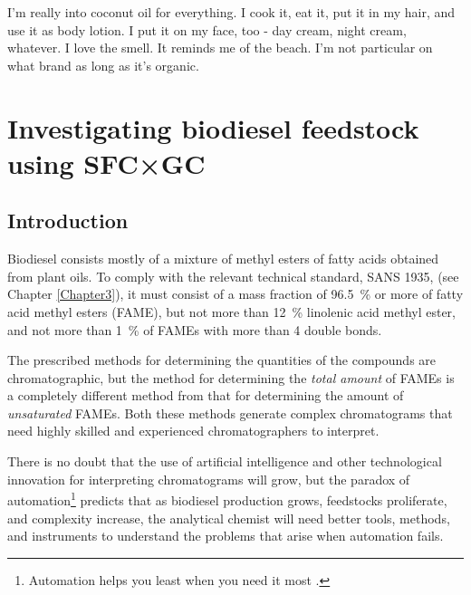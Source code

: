 
\begin{savequote}[\quotewidth] I'm really into coconut oil for everything. I cook it,
eat it, put it in my hair, and use it as body lotion. I put it on my face, too -
day cream, night cream, whatever. I love the smell. It reminds me of the beach.
I'm not particular on what brand as long as it's organic.

\end{savequote}

\chapter{Investigating biodiesel feedstock using SFC×GC} %

\label{Chapter6} %

\section{Introduction}


Biodiesel consists mostly of a mixture of methyl esters of fatty acids obtained
from plant oils. To comply with the relevant technical standard, SANS 1935,
\autocite{SANS1935} (see Chapter \ref{Chapter3}), it must consist of a mass
fraction of \SI{96.5}{\percent} or more of fatty acid methyl esters (FAME), but
not more than \SI{12}{\percent} linolenic acid methyl ester, and not more than
\SI{1}{\percent} of FAMEs with more than \num{4} double bonds.

The prescribed methods for determining the quantities of the compounds are
chromatographic, but the method for  determining the \textit{total amount} of
FAMEs is a completely different method from that for determining the amount of
\textit{unsaturated} FAMEs. Both these methods generate complex chromatograms
that need highly skilled and experienced chromatographers to interpret.

There is no doubt that the use of artificial intelligence and other
technological innovation for interpreting chromatograms will grow, but the
paradox of automation\footnote{Automation helps you least when you need it most
\autocite{Strauch2018, Bainbridge1983}.} predicts that as biodiesel production
grows, feedstocks proliferate, and complexity increase, the analytical chemist
will need better tools, methods, and instruments to understand the problems that
arise when automation fails.

